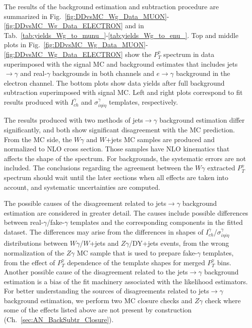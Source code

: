 The results of the background estimation and subtraction procedure are summarized in Fig.~\ref{fig:DDvsMC_Wg_Data_MUON}-\ref{fig:DDvsMC_Wg_Data_ELECTRON} and in Tab.~\ref{tab:yields_Wg_to_munu_}-\ref{tab:yields_Wg_to_enu_}. Top and middle plots in Fig.~\ref{fig:DDvsMC_Wg_Data_MUON}-\ref{fig:DDvsMC_Wg_Data_ELECTRON} show the $P_T^\gamma$ spectrum in data superimposed with the signal MC and background estimates that includes jets$\rightarrow\gamma$ and real-$\gamma$ backgrounds in both channels and $e\rightarrow\gamma$ background in the electron channel. The bottom plots show data yields after full background subtraction superimposed with signal MC. Left and right plots correspond to fit results produced with $I_{ch}^{\gamma}$ and $\sigma_{i\eta i\eta}^{\gamma}$ templates, respectively.

The results produced with two methods of jets$\rightarrow\gamma$ background estimation differ significantly, and both show significant disagreement with the MC prediction. From the MC side, the $W\gamma$ and $W$+jets MC samples are produced and normalized to NLO cross section. Those samples have NLO kinematics that affects the shape of the spectrum. For backgrounds, the systematic errors are not included. The conclusions regarding the agreement between the $W\gamma$ extracted $P_T^{\gamma}$ spectrum should wait until the later sections when all effects are taken into account, and systematic uncertainties are computed.

The possible causes of the disagreement related to jets$\rightarrow\gamma$ background estimation are considered in greater detail. The causes include possible differences between real-$\gamma$/fake-$\gamma$ templates and the corresponding components in the fitted dataset. The differences may arise from the differences in shapes of $I_{ch}^{\gamma}$/$\sigma_{i\eta i\eta}^{\gamma}$ distributions between $W\gamma$/$W$+jets and $Z\gamma$/DY+jets events, from the wrong normalization of the $Z\gamma$ MC sample that is used to prepare fake-$\gamma$ templates, from the effect of $P_T^{\gamma}$ dependence of the template shapes for merged $P_T^{\gamma}$ bins. Another possible cause of the disagreement related to the jets$\rightarrow\gamma$ background estimation is a bias of the fit machinery associated with the likelihood estimators. For better understanding the sources of disagreements related to jets$\rightarrow\gamma$ background estimation, we perform two MC closure checks and $Z\gamma$ check where some of the effects listed above are not present by construction (Ch.~\ref{sec:AN_BackSubtr_Closure}).

